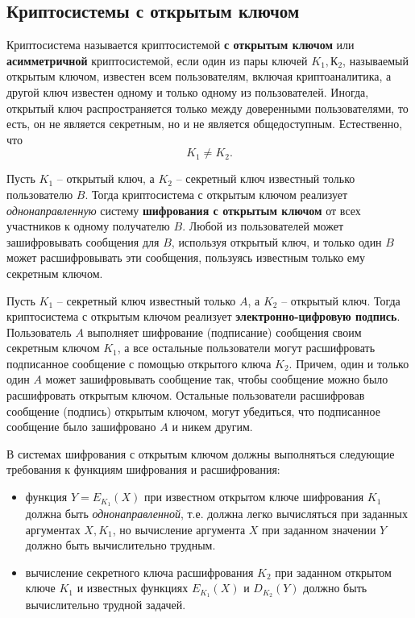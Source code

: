 \subsection{Криптосистемы с открытым ключом}

Криптосистема называется криптосистемой \textbf{с открытым ключом} или \textbf{асимметричной} криптосистемой, если один из пары ключей $K_1, К_2$, называемый открытым ключом, известен всем пользователям, включая криптоаналитика, а другой ключ известен одному и только одному из пользователей. Иногда, открытый ключ распространяется только между доверенными пользователями, то есть, он не является секретным, но и не является общедоступным. Естественно, что
    \[ K_1 \neq K_2. \]

Пусть $K_1$ -- открытый ключ, а $K_2$ -- секретный ключ известный только пользователю $B$. Тогда криптосистема с открытым ключом реализует \emph{однонаправленную} систему \textbf{шифрования с открытым ключом} от всех участников к одному получателю $B$. Любой из пользователей может зашифровывать сообщения для $B$, используя открытый ключ, и только один $B$ может расшифровывать эти сообщения, пользуясь известным только ему секретным ключом.

Пусть $K_1$ -- секретный ключ известный только $A$, а $K_2$ -- открытый ключ. Тогда криптосистема с открытым ключом реализует \textbf{электронно-цифровую подпись}. Пользователь $A$ выполняет шифрование (подписание) сообщения своим секретным ключом $K_1$, а все остальные пользователи могут расшифровать подписанное сообщение с помощью открытого ключа $K_2$. Причем, один и только один $A$ может зашифровывать сообщение так, чтобы сообщение можно было расшифровать открытым ключом. Остальные пользователи расшифровав сообщение (подпись) открытым ключом, могут убедиться, что подписанное сообщение было зашифровано $A$ и никем другим.

В системах шифрования с открытым ключом должны выполняться следующие требования к функциям шифрования и расшифрования:
\begin{itemize}
   \item функция $Y = E_{K_1}(X)$ при известном открытом ключе шифрования $K_1$ должна быть \emph{однонаправленной}, т.е.  должна легко вычисляться при заданных аргументах $X, K_1$, но вычисление аргумента $X$ при заданном значении $Y$ должно быть вычислительно трудным.
   \item вычисление секретного ключа расшифрования $K_2$ при заданном открытом ключе $K_1$ и известных функциях $E_{K_1}(X)$ и $D_{K_2}(Y)$  должно быть вычислительно трудной задачей.
\end{itemize}

